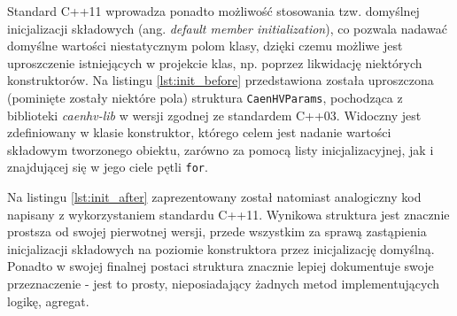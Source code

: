 


Standard C++11 wprowadza ponadto możliwość stosowania tzw. domyślnej inicjalizacji składowych (ang. \emph{default member initialization}), co pozwala nadawać domyślne wartości niestatycznym polom klasy, dzięki czemu możliwe jest uproszczenie istniejących w projekcie klas, np. poprzez likwidację niektórych konstruktorów. Na listingu \ref{lst:init_before} przedstawiona została uproszczona (pominięte zostały niektóre pola) struktura \lstinline{CaenHVParams}, pochodząca z biblioteki \emph{caenhv-lib} w wersji zgodnej ze standardem C++03. Widoczny jest zdefiniowany w klasie konstruktor, którego celem jest nadanie wartości składowym tworzonego obiektu, zarówno za pomocą listy inicjalizacyjnej, jak i znajdującej się w jego ciele pętli \lstinline{for}.





Na listingu \ref{lst:init_after} zaprezentowany został natomiast analogiczny kod napisany z wykorzystaniem standardu C++11. Wynikowa struktura jest znacznie prostsza od swojej pierwotnej wersji, przede wszystkim za sprawą zastąpienia inicjalizacji składowych na poziomie konstruktora przez inicjalizację domyślną. Ponadto w swojej finalnej postaci struktura znacznie lepiej dokumentuje swoje przeznaczenie - jest to prosty, nieposiadający żadnych metod implementujących logikę, agregat. 



